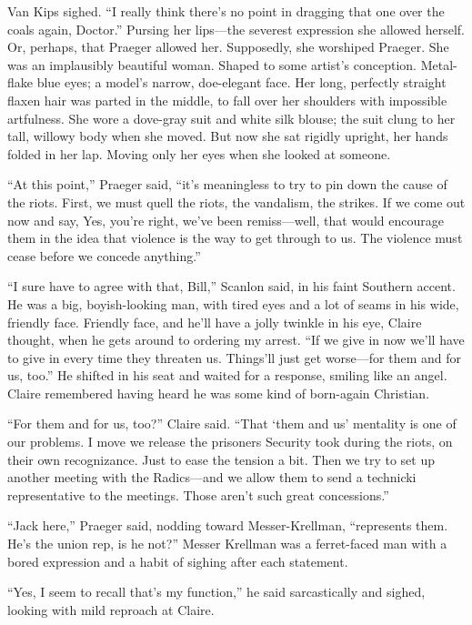Van Kips sighed. ``I really think there's no point in dragging that one over the coals again, Doctor.'' Pursing her lips—the severest expression she allowed herself. Or, perhaps, that Praeger allowed her. Supposedly, she worshiped Praeger. She was an implausibly beautiful woman. Shaped to some artist's conception. Metal-flake blue eyes; a model's narrow, doe-elegant face. Her long, perfectly straight flaxen hair was parted in the middle, to fall over her shoulders with impossible artfulness. She wore a dove-gray suit and white silk blouse; the suit clung to her tall, willowy body when she moved. But now she sat rigidly upright, her hands folded in her lap. Moving only her eyes when she looked at someone.

``At this point,'' Praeger said, ``it's meaningless to try to pin down the cause of the riots. First, we must quell the riots, the vandalism, the strikes. If we come out now and say, Yes, you're right, we've been remiss—well, that would encourage them in the idea that violence is the way to get through to us. The violence must cease before we concede anything.''

``I sure have to agree with that, Bill,'' Scanlon said, in his faint Southern accent. He was a big, boyish-looking man, with tired eyes and a lot of seams in his wide, friendly face. Friendly face, and he'll have a jolly twinkle in his eye, Claire thought, when he gets around to ordering my arrest. ``If we give in now we'll have to give in every time they threaten us. Things'll just get worse—for them and for us, too.'' He shifted in his seat and waited for a response, smiling like an angel. Claire remembered having heard he was some kind of born-again Christian.

``For them and for us, too?'' Claire said. ``That ‘them and us' mentality is one of our problems. I move we release the prisoners Security took during the riots, on their own recognizance. Just to ease the tension a bit. Then we try to set up another meeting with the Radics—and we allow them to send a technicki representative to the meetings. Those aren't such great concessions.''

``Jack here,'' Praeger said, nodding toward Messer-Krellman, ``represents them. He's the union rep, is he not?'' Messer Krellman was a ferret-faced man with a bored expression and a habit of sighing after each statement.

``Yes, I seem to recall that's my function,'' he said sarcastically and sighed, looking with mild reproach at Claire.

